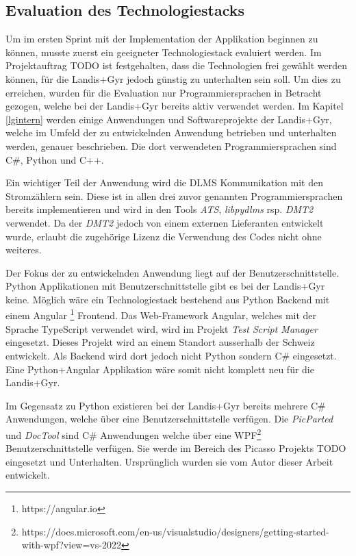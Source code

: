 \subsection{Evaluation des Technologiestacks}
Um im ersten Sprint mit der Implementation der Applikation beginnen zu können, musste zuerst ein geeigneter Technologiestack evaluiert werden.
Im Projektauftrag TODO ist festgehalten, dass die Technologien frei gewählt werden können, für die Landis+Gyr jedoch günstig zu unterhalten sein soll.
Um dies zu erreichen, wurden für die Evaluation nur Programmiersprachen in Betracht gezogen, welche bei der Landis+Gyr bereits aktiv verwendet werden.
Im Kapitel \ref{lgintern} werden einige Anwendungen und Softwareprojekte der Landis+Gyr, welche im Umfeld der zu entwickelnden Anwendung betrieben und unterhalten werden, genauer beschrieben.
Die dort verwendeten Programmiersprachen sind C\#, Python und C++.


Ein wichtiger Teil der Anwendung wird die \ac{DLMS} Kommunikation mit den Stromzählern sein.
Diese ist in allen drei zuvor genannten Programmiersprachen bereits implementieren und wird in den Tools \textit{ATS}, \textit{libpydlms} rsp. \textit{DMT2} verwendet.
Da der \textit{DMT2} jedoch von einem externen Lieferanten entwickelt wurde, erlaubt die zugehörige Lizenz die Verwendung des Codes nicht ohne weiteres.


Der Fokus der zu entwickelnden Anwendung liegt auf der Benutzerschnittstelle.
Python Applikationen mit Benutzerschnittstelle gibt es bei der Landis+Gyr keine.
Möglich wäre ein Technologiestack bestehend aus Python Backend mit einem Angular \footnote{https://angular.io} Frontend.
Das Web-Framework Angular, welches mit der Sprache TypeScript verwendet wird, wird im Projekt \textit{Test Script Manager} eingesetzt.
Dieses Projekt wird an einem Standort ausserhalb der Schweiz entwickelt.
Als Backend wird dort jedoch nicht Python sondern C\# eingesetzt.
Eine Python+Angular Applikation wäre somit nicht komplett neu für die Landis+Gyr.

Im Gegensatz zu Python existieren bei der Landis+Gyr bereits mehrere C\# Anwendungen, welche über eine Benutzerschnittstelle verfügen.
Die \textit{PicParted} und \textit{DocTool} sind C\# Anwendungen welche über eine \ac{WPF}\footnote{https://docs.microsoft.com/en-us/visualstudio/designers/getting-started-with-wpf?view=vs-2022} Benutzerschnittstelle verfügen.
Sie werde im Bereich des Picasso Projekts TODO eingesetzt und Unterhalten. 
Ursprünglich wurden sie vom Autor dieser Arbeit entwickelt.

